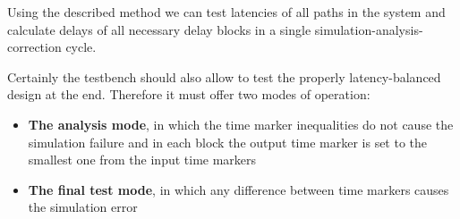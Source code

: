 \documentclass[preprint,11pt]{elsarticle}
\begin{document}
Using the described method we can test latencies of all paths in the system and calculate delays of all necessary delay blocks in a single simulation-analysis-correction cycle.
	
Certainly the testbench should also allow to test the properly latency-balanced design at the end. Therefore it must offer two modes of operation:
\begin{itemize}
 \item {\bf The analysis mode}, in which the time marker inequalities do not cause the simulation failure and in each block the output time marker is set to the smallest one from the input time markers 
 \item {\bf The final test mode}, in which any difference between time markers causes the simulation error
\end{itemize}
\end{document}
